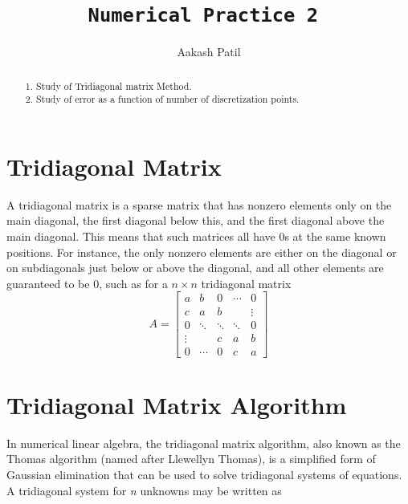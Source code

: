 \documentclass[preprint,12pt,3p]{elsarticle}
\begin{document}
\begin{frontmatter}

\title{ \texttt{Numerical Practice 2 }}


\author{Aakash Patil}
\address{aakash.patil@master.centralelille.fr}


\begin{abstract}
1. Study of Tridiagonal matrix Method.  
\\
2. Study of error as a function of number of discretization points.
\end{abstract}


\end{frontmatter}


\section{Tridiagonal Matrix}
A tridiagonal matrix is a sparse matrix that has nonzero elements only on the main diagonal, the first diagonal below this, and the first diagonal above the main diagonal. This means that such matrices all have 0s at the same known positions. For instance, the only nonzero elements are either on the diagonal or on subdiagonals just below or above the diagonal, and all other elements are guaranteed to be 0, such as for a $n\times n$ tridiagonal matrix
$$
A = \left[
  \begin{array}{ccccc}
    a & b    & 0    &\cdots& 0\\
    c & a    & b    & &\vdots\\
    0 &\ddots&\ddots&\ddots& 0\\
    \vdots&   & c    & a & b\\
    0 & \cdots& 0    & c & a
  \end{array}
  \right]
$$


\section{Tridiagonal Matrix Algorithm}
In numerical linear algebra, the tridiagonal matrix algorithm, also known as the Thomas
algorithm (named after Llewellyn Thomas), is a
simplified form of Gaussian elimination
that can be used to solve tridiagonal systems
of equations. A tridiagonal system for \emph{n} unknowns may be written
as
\end{document}
